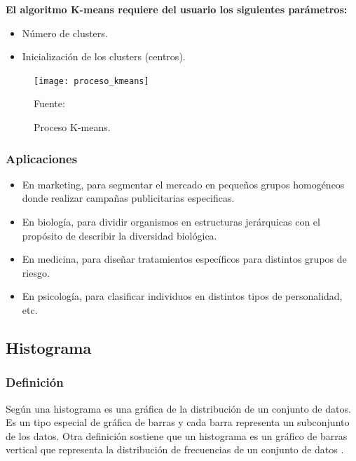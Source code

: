 \textbf{El algoritmo K-means requiere del usuario los siguientes parámetros:}

\begin{itemize}
	\item Número de clusters.
	\item Inicialización de los clusters (centros).
\end{itemize}

\begin{figure}[ht]
	\begin{center}
		\texttt{[image: proceso\_kmeans]}
	\end{center}
	\begin{center}
		\vskip -0.5cm
		\caption{\small{Proceso K-means.}}
		{\small{Fuente: }}
	\end{center}
\end{figure}


\subsubsection{Aplicaciones}

\begin{itemize}
	\item En marketing, para segmentar el mercado en pequeños grupos homogéneos donde realizar campañas publicitarias especificas.
	\item En biología, para dividir organismos en estructuras jerárquicas con el propósito de describir la diversidad biológica.
	\item En medicina, para diseñar tratamientos específicos para distintos grupos de riesgo.
	\item En psicología, para clasificar individuos en distintos tipos de personalidad, etc.
\end{itemize}

\subsection{Histograma}

\subsubsection{Definición}

Según \citep{histograma_unam} una histograma es una gráfica de la distribución de un conjunto de datos. Es un tipo especial de gráfica de barras y cada barra representa un subconjunto de los datos. Otra definición sostiene que un histograma es un gráfico de barras vertical que representa la distribución de frecuencias de un conjunto de datos \citep{histograma_aiteco}.


